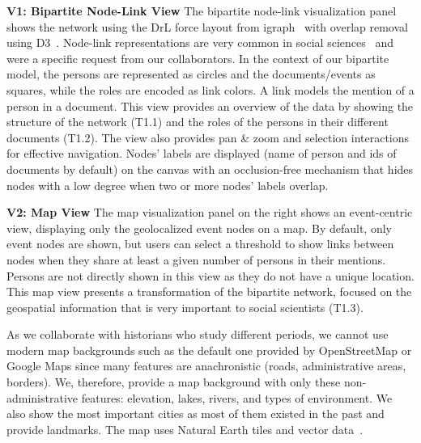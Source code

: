 \noindent\textbf{V1: Bipartite Node-Link View}
The bipartite node-link visualization panel shows the network using the DrL force layout from igraph~\cite{igraph} with overlap removal using D3~\cite{d3}.
Node-link representations are very common in social sciences~\cite{Gephi, pajek, NodeXL, cristofoliPrincipesUsagesDessins} and were a specific request from our collaborators.
In the context of our bipartite model, the persons are represented as circles and the documents/events as squares, while the roles are encoded as link colors.
A link models the mention of a person in a document.
This view provides an overview of the data by showing the structure of the network (T1.1) and the roles of the persons in their different documents (T1.2).
The view also provides pan \& zoom and selection interactions for effective navigation.
Nodes' labels are displayed (name of person and ids of documents by default) on the canvas with an occlusion-free mechanism that hides nodes with a low degree when two or more nodes' labels overlap.


\noindent\textbf{V2: Map View}
The map visualization panel on the right shows an event-centric view, displaying only the geolocalized event nodes on a map.
By default, only event nodes are shown, but users can select a threshold to show links between nodes when they share at least a given number of persons in their mentions.
Persons are not directly shown in this view as they do not have a unique location.
This map view presents a transformation of the bipartite network, focused on the geospatial information that is very important to social scientists (T1.3).

As we collaborate with historians who study different periods, we cannot use modern map backgrounds such as the default one provided by OpenStreetMap or Google Maps since many features are anachronistic (\eg roads, administrative areas, borders). We, therefore, provide a map background with only these non-administrative features: elevation, lakes, rivers, and types of environment.
We also show the most important cities as most of them existed in the past and provide landmarks.
The map uses Natural Earth tiles and vector data~\cite{NaturalEarth}.

